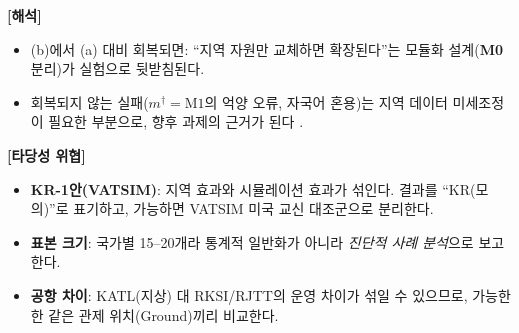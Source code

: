 \documentclass[10pt,a4paper]{article}
\newcommand{\md}[1]{\textbf{\textcolor{blue!60!black}{#1}}}
\begin{document}
\textbf{[해석]}
\begin{itemize}
\item (b)에서 (a) 대비 회복되면: ``지역 자원만 교체하면 확장된다''는 모듈화 설계(\md{M0} 분리)가 실험으로 뒷받침된다.
\item 회복되지 않는 실패($m^\dagger=\mathrm{M1}$의 억양 오류, 자국어 혼용)는 지역 데이터 미세조정이 필요한 부분으로, 향후 과제의 근거가 된다 \cite{usatc2025,chen2023}.
\end{itemize}

\textbf{[타당성 위협]}
\begin{itemize}
\item \textbf{KR-1안(VATSIM)}: 지역 효과와 시뮬레이션 효과가 섞인다. 결과를 ``KR(모의)''로 표기하고, 가능하면 VATSIM 미국 교신 대조군으로 분리한다.
\item \textbf{표본 크기}: 국가별 15--20개라 통계적 일반화가 아니라 \emph{진단적 사례 분석}으로 보고한다.
\item \textbf{공항 차이}: KATL(지상) 대 RKSI/RJTT의 운영 차이가 섞일 수 있으므로, 가능한 한 같은 관제 위치(Ground)끼리 비교한다.
\end{itemize}

\end{document}
